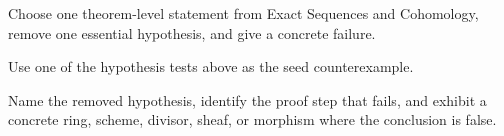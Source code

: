\begin{exercise}\label{exr:vi48-expand-16}
Choose one theorem-level statement from Exact Sequences and Cohomology, remove one essential hypothesis, and give a concrete failure.
\end{exercise}
\begin{hint}
Use one of the hypothesis tests above as the seed counterexample.
\end{hint}
\begin{solution}
Name the removed hypothesis, identify the proof step that fails, and exhibit a concrete ring, scheme, divisor, sheaf, or morphism where the conclusion is false.
\end{solution}

